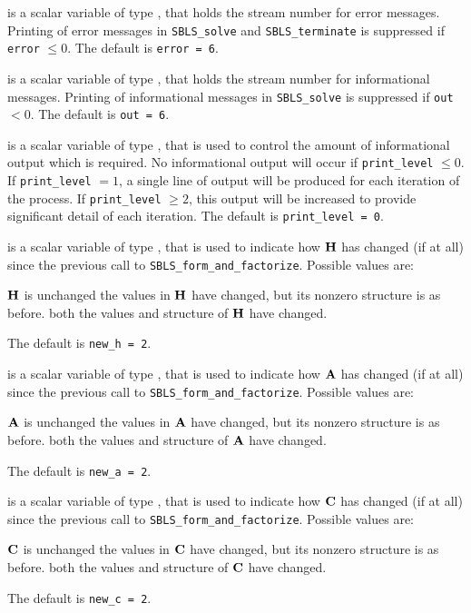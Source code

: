 \documentclass{galahad}
\newcommand{\packagename}{SBLS}
\begin{document}
\begin{description}

 is a scalar variable of type \integer, that holds the
stream number for error messages. Printing of error messages in
{\tt \packagename\_solve} and {\tt \packagename\_terminate}
is suppressed if {\tt error} $\leq 0$.
The default is {\tt error = 6}.

 is a scalar variable of type \integer, that holds the
stream number for informational messages. Printing of informational messages in
{\tt \packagename\_solve} is suppressed if {\tt out} $< 0$.
The default is {\tt out = 6}.

 is a scalar variable of type \integer, that is used
to control the amount of informational output which is required. No
informational output will occur if {\tt print\_level} $\leq 0$. If
{\tt print\_level} $= 1$, a single line of output will be produced for each
iteration of the process. If {\tt print\_level} $\geq 2$, this output will be
increased to provide significant detail of each iteration.
The default is {\tt print\_level = 0}.

 is a scalar variable of type \integer, that is used
to indicate how ${\mathbf{H}}$ has changed (if at all) since the previous call
to {\tt SBLS\_form\_and\_factorize}. Possible values are:
\begin{description}
 ${\mathbf{H}}$ is unchanged
 the values in ${\mathbf{H}}$ have changed, but its nonzero structure
is as before.
 both the values and structure of ${\mathbf{H}}$ have changed.
\end{description}
The default is {\tt new\_h = 2}.

 is a scalar variable of type \integer, that is used
to indicate how ${\mathbf{A}}$ has changed (if at all) since the previous call
to {\tt SBLS\_form\_and\_factorize}. Possible values are:
\begin{description}
 ${\mathbf{A}}$ is unchanged
 the values in ${\mathbf{A}}$ have changed, but its nonzero structure
is as before.
 both the values and structure of ${\mathbf{A}}$ have changed.
\end{description}
The default is {\tt new\_a = 2}.

 is a scalar variable of type \integer, that is used
to indicate how ${\mathbf{C}}$ has changed (if at all) since the previous call
to {\tt SBLS\_form\_and\_factorize}. Possible values are:
\begin{description}
 ${\mathbf{C}}$ is unchanged
 the values in ${\mathbf{C}}$ have changed, but its nonzero structure
is as before.
 both the values and structure of ${\mathbf{C}}$ have changed.
\end{description}
The default is {\tt new\_c = 2}.


\end{description}
\end{document}

